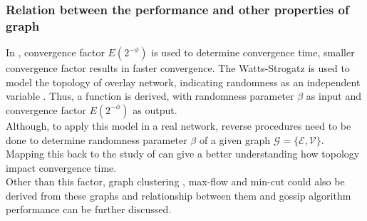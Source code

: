 \subsubsection{Relation between the performance and other properties of graph}
In \cite{jelasity_gossip-based_2005}, convergence factor $E(2^{-\phi})$ is used to determine convergence time, smaller convergence factor results in faster convergence. The Watts-Strogatz is used to model the topology of overlay network, indicating randomness as an independent variable \cite{Watts1998}. Thus, a function is derived, with randomness parameter $\beta$ as input and convergence factor $E(2^{-\phi})$ as output.\\
Although, to apply this model in a real network, reverse procedures need to be done to determine randomness parameter $\beta$ of a given graph $\mathcal{G}=\{\mathcal{E}, \mathcal{V}\}$. Mapping this back to the study of \cite{jelasity_gossip-based_2005} can give a better understanding how topology impact convergence time.\\
Other than this factor, graph clustering \cite{Schaeffer200727}, max-flow and min-cut \cite{PapadimitriouS82} could also be derived from these graphs and relationship between them and gossip algorithm performance can be further discussed.\\
